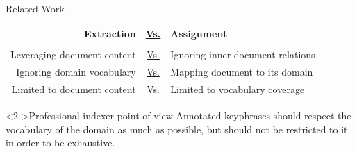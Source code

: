 \begin{frame}{Related Work}
  \begin{center}
    \begin{tabular}{rcl}
      \textbf{Extraction} & \underline{\textbf{Vs.}} & \textbf{Assignment}\\
      & & \\
      Leveraging document content & \underline{Vs.} & Ignoring inner-document relations\\
      Ignoring domain vocabulary & \underline{Vs.} & Mapping document to its domain\\
      Limited to document content & \underline{Vs.} & Limited to vocabulary coverage
    \end{tabular}
  \end{center}
  
  \vfill{}
  
  \begin{block}<2->{Professional indexer point of view}
    Annotated keyphrases should respect the vocabulary of the domain as much as possible, but should not be restricted to it in order to be exhaustive.
  \end{block}
\end{frame}
